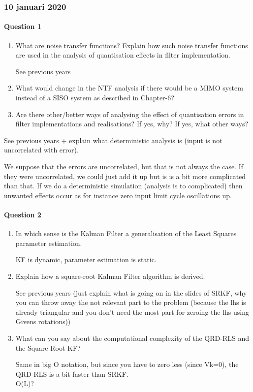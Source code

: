 \documentclass[
  a4paper,
  ,captions=tableheading
]{scrartcl}
\begin{document}
\subsubsection{\texorpdfstring{\textbf{10 januari
2020}}{10 januari 2020}}\label{januari-2020-1}

\paragraph{Question 1}\label{question-1-2}

\begin{enumerate}
\def\labelenumi{\arabic{enumi}.}
\item
  What are noise transfer functions? Explain how such noise transfer
  functions are used in the analysis of quantisation effects in filter
  implementation.

  See previous years
\item
  What would change in the NTF analysis if there would be a MIMO system
  instead of a SISO system as described in Chapter-6?
\item
  Are there other/better ways of analysing the effect of quantisation
  errors in filter implementations and realisations? If yes, why? If
  yes, what other ways?
\end{enumerate}

See previous years + explain what deterministic analysis is (input is
not uncorrelated with error).

We suppose that the errors are uncorrelated, but that is not always the
case. If they were uncorrelated, we could just add it up but is is a bit
more complicated than that. If we do a deterministic simulation
(analysis is to complicated) then unwanted effects occur as for instance
zero input limit cycle oscillations up.

\paragraph{Question 2}\label{question-2-2}

\begin{enumerate}
\def\labelenumi{\arabic{enumi}.}
\item
  In which sense is the Kalman Filter a generalisation of the Least
  Squares parameter estimation.

  KF is dynamic, parameter estimation is static.
\item
  Explain how a square-root Kalman Filter algorithm is derived.

  See previous years (just explain what is going on in the slides of
  SRKF, why you can throw away the not relevant part to the problem
  (because the lhs is already triangular and you don't need the most
  part for zeroing the lhs using Givens rotations))
\item
  What can you say about the computational complexity of the QRD-RLS and
  the Square Root KF?

  Same in big O notation, but since you have to zero less (since Vk=0),
  the QRD-RLS is a bit faster than SRKF.\\
  O(L)?
\end{enumerate}
\end{document}
